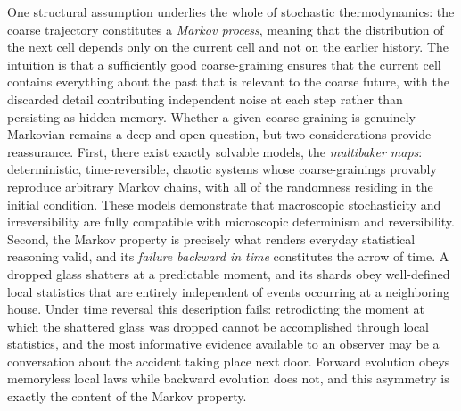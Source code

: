 \documentclass[11pt]{article}
\begin{document}
One structural assumption underlies the whole of stochastic thermodynamics: the coarse trajectory constitutes a \emph{Markov process}, meaning that the distribution of the next cell depends only on the current cell and not on the earlier history. The intuition is that a sufficiently good coarse-graining ensures that the current cell contains everything about the past that is relevant to the coarse future, with the discarded detail contributing independent noise at each step rather than persisting as hidden memory. Whether a given coarse-graining is genuinely Markovian remains a deep and open question, but two considerations provide reassurance. First, there exist exactly solvable models, the \emph{multibaker maps}: deterministic, time-reversible, chaotic systems whose coarse-grainings provably reproduce arbitrary Markov chains, with all of the randomness residing in the initial condition. These models demonstrate that macroscopic stochasticity and irreversibility are fully compatible with microscopic determinism and reversibility. Second, the Markov property is precisely what renders everyday statistical reasoning valid, and its \emph{failure backward in time} constitutes the arrow of time. A dropped glass shatters at a predictable moment, and its shards obey well-defined local statistics that are entirely independent of events occurring at a neighboring house. Under time reversal this description fails: retrodicting the moment at which the shattered glass was dropped cannot be accomplished through local statistics, and the most informative evidence available to an observer may be a conversation about the accident taking place next door. Forward evolution obeys memoryless local laws while backward evolution does not, and this asymmetry is exactly the content of the Markov property.
\end{document}
